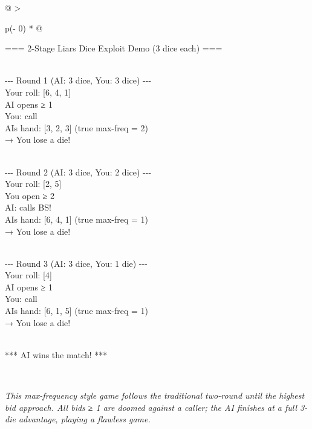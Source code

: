 \documentclass[
]{article}
\begin{document}
\begin{longtable}[]{@{}
  >{\raggedright\arraybackslash}p{(\columnwidth - 0\tabcolsep) * }@{}}
\toprule\noalign{}
\begin{minipage}[b]{\linewidth}\raggedright
=== 2-Stage Liar\textquotesingle s Dice Exploit Demo (3 dice each) ===\\
\strut \\
-\/-\/- Round 1 (AI: 3 dice, You: 3 dice) -\/-\/-\\
Your roll: {[}6, 4, 1{]}\\
AI opens ≥ 1\\
You: call\\
AI\textquotesingle s hand: {[}3, 2, 3{]} (true max-freq = 2)\\
→ You lose a die!\\
\strut \\
-\/-\/- Round 2 (AI: 3 dice, You: 2 dice) -\/-\/-\\
Your roll: {[}2, 5{]}\\
You open ≥ 2\\
AI: calls BS!\\
AI\textquotesingle s hand: {[}6, 4, 1{]} (true max-freq = 1)\\
→ You lose a die!\\
\strut \\
-\/-\/- Round 3 (AI: 3 dice, You: 1 die) -\/-\/-\\
Your roll: {[}4{]}\\
AI opens ≥ 1\\
You: call\\
AI\textquotesingle s hand: {[}6, 1, 5{]} (true max-freq = 1)\\
→ You lose a die!\\
\strut \\
*** AI wins the match! ***\strut
\end{minipage} \\
\midrule\noalign{}
\endhead
\bottomrule\noalign{}
\endlastfoot
\end{longtable}

\emph{This max-frequency style game follows the traditional two-round
until the highest bid approach. All bids ≥ 1 are doomed against a
caller; the AI finishes at a full 3-die advantage, playing a flawless
game.}
\end{document}
